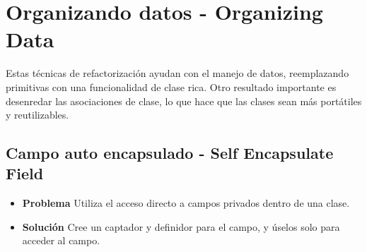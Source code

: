 \documentclass[11pt,a4paper,oneside]{book}
\begin{document}
\section{Organizando datos - Organizing Data}

Estas técnicas de refactorización ayudan con el manejo de datos, reemplazando primitivas con una funcionalidad de clase rica. Otro resultado importante es desenredar las asociaciones de clase, lo que hace que las clases sean más portátiles y reutilizables.

\subsection{Campo auto encapsulado - Self Encapsulate Field}
\label{selfencapsulatefield}
\begin{itemize}
    \item \textbf{Problema} Utiliza el acceso directo a campos privados dentro de una clase.
    
    \item \textbf{Solución} Cree un captador y definidor para el campo, y úselos solo para acceder al campo.
    
\end{itemize}
    
\end{document}
